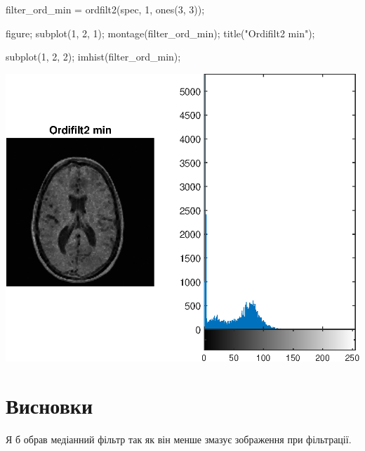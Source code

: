\documentclass[12pt]{article}
\begin{document}
\begin{matlabcode}
filter_ord_min = ordfilt2(spec, 1, ones(3, 3));

figure;
subplot(1, 2, 1);
montage(filter_ord_min);
title("Ordifilt2 min");

subplot(1, 2, 2);
imhist(filter_ord_min);
\end{matlabcode}
\begin{center}
\includegraphics[width=\maxwidth{56.196688409433015em}]{figure_9}
\end{center}

\section{Висновки}
Я б обрав медіанний фільтр так як він менше змазує зображення при фільтрації.
\end{document}
